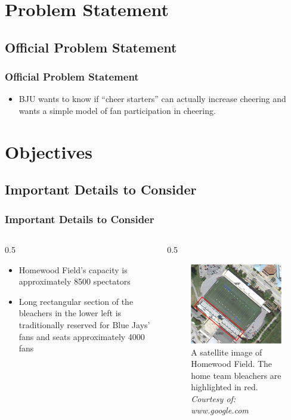 \documentclass[compress,handout,10pt]{beamer}
\let\olditem\item
\renewcommand{\item}{\setlength{\itemsep}{0.5\baselineskip}\olditem}
\begin{document}
\section{Problem Statement}

\subsection{Official Problem Statement}

\begin{frame}
	\frametitle{Official Problem Statement}
		\begin{itemize}
			\item BJU wants to know if ``cheer starters'' can actually increase cheering and wants a simple model of fan participation in cheering.
		\end{itemize}
\end{frame}

\section {Objectives}

\subsection{Important Details to Consider}

\begin{frame}
	\frametitle {Important Details to Consider}
	\begin {columns}
		\begin {column}{0.5\textwidth}
		\begin{itemize}
			\item Homewood Field's capacity is approximately 8500 spectators \cite{wiki}
			\item Long rectangular section of the bleachers in the lower left is traditionally reserved for Blue Jays' fans and seats approximately 4000 fans
		\end {itemize}
	\end {column}
	\begin {column}{0.5\textwidth}
	\begin {figure}
	\begin{center}
		\includegraphics [width=2in] {Bleachers.png}
		\caption {{\tiny A satellite image of Homewood Field. The home team bleachers are highlighted in red. \textit{Courtesy of: www.google.com}}}
		\end{center}
	\end{figure}
\end {column}
\end {columns}
\end{frame}
\end{document}
